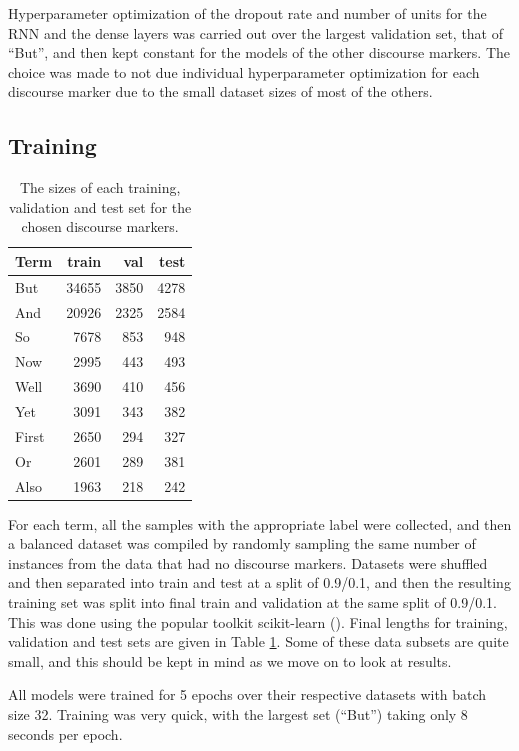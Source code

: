 Hyperparameter optimization of the dropout rate and number of units for the RNN and the dense layers was carried out over the largest validation set, that of ``But'', and then kept constant for the models of the other discourse markers. The choice was made to not due individual hyperparameter optimization for each discourse marker due to the small dataset sizes of most of the others.

\subsection{Training}

\begin{table}[h]
\centering
 \begin{tabular}{|| l | r | r | r ||}
 \hline
 Term & train & val & test \\ [0.3ex] 
 \hline\hline
 But & 34655 & 3850 & 4278 \\
 \hline
 And & 20926 & 2325 & 2584 \\
 \hline
 So & 7678 & 853 & 948 \\
 \hline
 Now & 2995 & 443 & 493 \\
 \hline
 Well & 3690 & 410 & 456 \\
 \hline
 Yet & 3091 & 343 & 382 \\
 \hline
 First & 2650 & 294 & 327 \\
 \hline
 Or & 2601 & 289 & 381 \\
 \hline
 Also & 1963 & 218 & 242 \\
 \hline
\end{tabular}
\caption{The sizes of each training, validation and test set for the chosen discourse markers.}
\label{disc-mark-train-tune-test}
\end{table}

For each term, all the samples with the appropriate label were collected, and then a balanced dataset was compiled by randomly sampling the same number of instances from the data that had no discourse markers. Datasets were shuffled and then separated into train and test at a split of 0.9/0.1, and then the resulting training set was split into final train and validation at the same split of 0.9/0.1. This was done using the popular toolkit scikit-learn (\cite{scikit-learn}). Final lengths for training, validation and test sets are given in Table \ref{disc-mark-train-tune-test}. Some of these data subsets are quite small, and this should be kept in mind as we move on to look at results.

All models were trained for 5 epochs over their respective datasets with batch size 32. Training was very quick, with the largest set (``But'') taking only 8 seconds per epoch.

